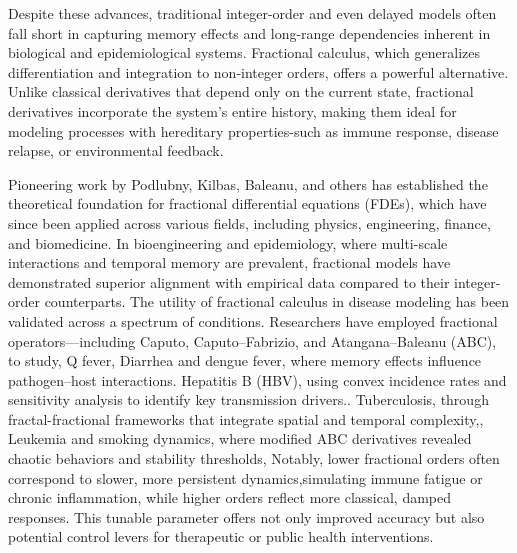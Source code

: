 \documentclass[10pt]{NSP1}
\begin{document}
Despite these advances, traditional integer-order and even delayed models often fall short in capturing memory effects and long-range dependencies inherent in biological and epidemiological systems. Fractional calculus, which generalizes differentiation and integration to non-integer orders, offers a powerful alternative. Unlike classical derivatives that depend only on the current state, fractional derivatives incorporate the system's entire history, making them ideal for modeling processes with hereditary properties-such as immune response, disease relapse, or environmental feedback.\cite{ref19,ref20}

Pioneering work by Podlubny, Kilbas, Baleanu, and others has established the theoretical foundation for fractional differential equations (FDEs), which have since been applied across various fields, including physics, engineering, finance, and biomedicine.\cite{ref21,ref22,ref23} In bioengineering and epidemiology, where multi-scale interactions and temporal memory are prevalent, fractional models have demonstrated superior alignment with empirical data compared to their integer-order counterparts.\cite{ref24,ref25} The utility of fractional calculus in disease modeling has been validated across a spectrum of conditions. Researchers have employed fractional operators---including Caputo, Caputo--Fabrizio, and Atangana--Baleanu (ABC), to study, Q fever, Diarrhea and dengue fever, where memory effects influence pathogen--host interactions.\cite{ref26,ref27,ref28} Hepatitis B (HBV), using convex incidence rates and sensitivity analysis to identify key transmission drivers.\cite{ref29}. Tuberculosis, through fractal-fractional frameworks that integrate spatial and temporal complexity,\cite{ref30}, Leukemia and smoking dynamics, where modified ABC derivatives revealed chaotic behaviors and stability thresholds, \cite{ref31,ref32} Notably, lower fractional orders often correspond to slower, more persistent dynamics,simulating immune fatigue or chronic inflammation, while higher orders reflect more classical, damped responses. This tunable parameter offers not only improved accuracy but also potential control levers for therapeutic or public health interventions.
\end{document}
